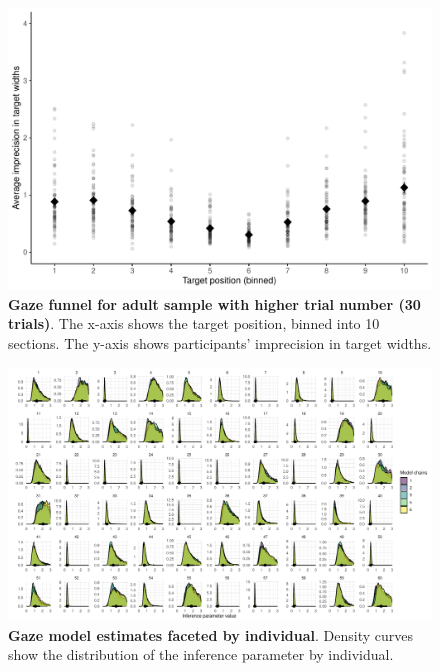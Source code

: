 \documentclass[
  man,floatsintext]{apa7}
\begin{document}
\newpage



\begin{figure}[H]
\includegraphics[width=1\linewidth]{../figures/gazefunnel_adults} \caption{\textbf{Gaze funnel for adult sample with higher trial number (30 trials)}. The x-axis shows the target position, binned into 10 sections. The y-axis shows participants' imprecision in target widths.}\label{fig:S2}
\end{figure}

\newpage



\begin{figure}[H]
\includegraphics[width=1\linewidth]{../figures/supplements_gazemodel_facetedinference} \caption{\textbf{Gaze model estimates faceted by individual}. Density curves show the distribution of the inference parameter by individual.}\label{fig:S3}
\end{figure}
\end{document}
